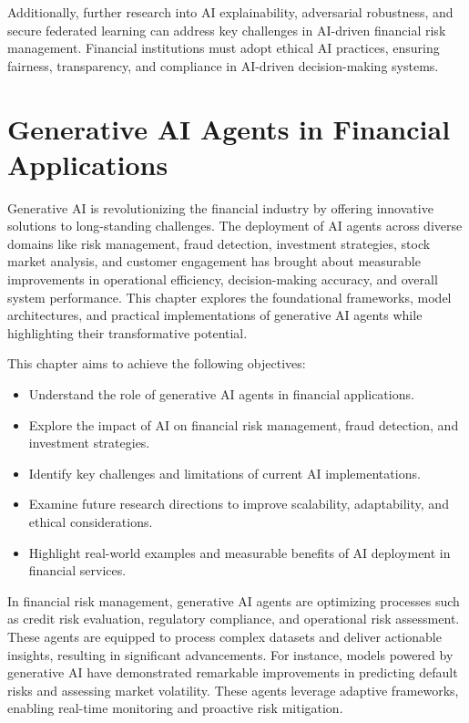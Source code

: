 \documentclass[a4paper,headinclude=on,footinclude=on,12pt,oneside]{scrbook}
\begin{document}
	Additionally, further research into AI explainability, adversarial robustness, and secure federated learning can address key challenges in AI-driven financial risk management. Financial institutions must adopt ethical AI practices, ensuring fairness, transparency, and compliance in AI-driven decision-making systems.
	
	
	
	\chapter{Generative AI Agents in Financial Applications}
	
	Generative AI is revolutionizing the financial industry by offering innovative solutions to long-standing challenges. The deployment of AI agents across diverse domains like risk management, fraud detection, investment strategies, stock market analysis, and customer engagement has brought about measurable improvements in operational efficiency, decision-making accuracy, and overall system performance. This chapter explores the foundational frameworks, model architectures, and practical implementations of generative AI agents while highlighting their transformative potential.
	
	
	This chapter aims to achieve the following objectives:
	
	\begin{itemize}
		\item Understand the role of generative AI agents in financial applications.
		\item Explore the impact of AI on financial risk management, fraud detection, and investment strategies.
		\item Identify key challenges and limitations of current AI implementations.
		\item Examine future research directions to improve scalability, adaptability, and ethical considerations.
		\item Highlight real-world examples and measurable benefits of AI deployment in financial services.
	\end{itemize}
	
	
	In financial risk management, generative AI agents are optimizing processes such as credit risk evaluation, regulatory compliance, and operational risk assessment. These agents are equipped to process complex datasets and deliver actionable insights, resulting in significant advancements. For instance, models powered by generative AI have demonstrated remarkable improvements in predicting default risks and assessing market volatility. These agents leverage adaptive frameworks, enabling real-time monitoring and proactive risk mitigation.
	
\end{document}
